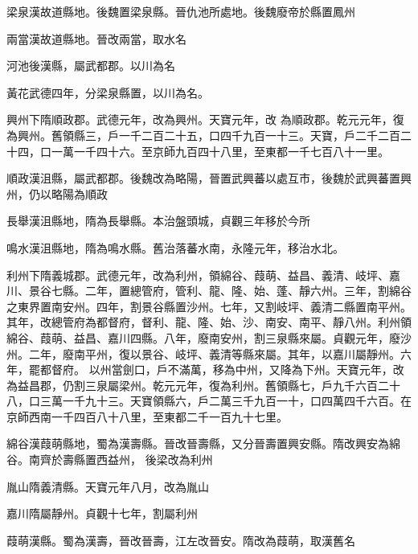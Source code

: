 \begin{pinyinscope}
 梁泉漢故道縣地。後魏置梁泉縣。晉仇池所處地。後魏廢帝於縣置鳳州



 兩當漢故道縣地。晉改兩當，取水名



 河池後漢縣，屬武都郡。以川為名



 黃花武德四年，分梁泉縣置，以川為名。



 興州下隋順政郡。武德元年，改為興州。天寶元年，改
 為順政郡。乾元元年，復為興州。舊領縣三，戶一千二百二十五，口四千九百一十三。天寶，戶二千二百二十四，口一萬一千四十六。至京師九百四十八里，至東都一千七百八十一里。



 順政漢沮縣，屬武都郡。後魏改為略陽，晉置武興蕃以處互市，後魏於武興蕃置興州，仍以略陽為順政



 長舉漢沮縣地，隋為長舉縣。本治盤頭城，貞觀三年移於今所



 鳴水漢沮縣地，隋為鳴水縣。舊治落蕃水南，永隆元年，移治水北。



 利州下隋義城郡。武德元年，改為利州，領綿谷、葭萌、益昌、義清、岐坪、嘉川、景谷七縣。二年，置總管府，管利、龍、隆、始、蓬、靜六州。三年，割綿谷之東界置南安州。四年，割景谷縣置沙州。七年，又割岐坪、義清二縣置南平州。其年，改總管府為都督府，督利、龍、隆、始、沙、南安、南平、靜八州。利州領綿谷、葭萌、益昌、嘉川四縣。八年，廢南安州，割三泉縣來屬。貞觀元年，廢沙州。二年，廢南平州，復以景谷、岐坪、義清等縣來屬。其年，以嘉川屬靜州。六年，罷都督府。
 以州當劍口，戶不滿萬，移為中州，又降為下州。天寶元年，改為益昌郡，仍割三泉屬梁州。乾元元年，復為利州。舊領縣七，戶九千六百二十八，口三萬一千九十三。天寶領縣六，戶二萬三千九百一十，口四萬四千六百。在京師西南一千四百八十八里，至東都二千一百九十七里。



 綿谷漢葭萌縣地，蜀為漢壽縣。晉改晉壽縣，又分晉壽置興安縣。隋改興安為綿谷。南齊於壽縣置西益州，
 後梁改為利州



 胤山隋義清縣。天寶元年八月，改為胤山



 嘉川隋屬靜州。貞觀十七年，割屬利州



 葭萌漢縣。蜀為漢壽，晉改晉壽，江左改晉安。隋改為葭萌，取漢舊名




\end{pinyinscope}
